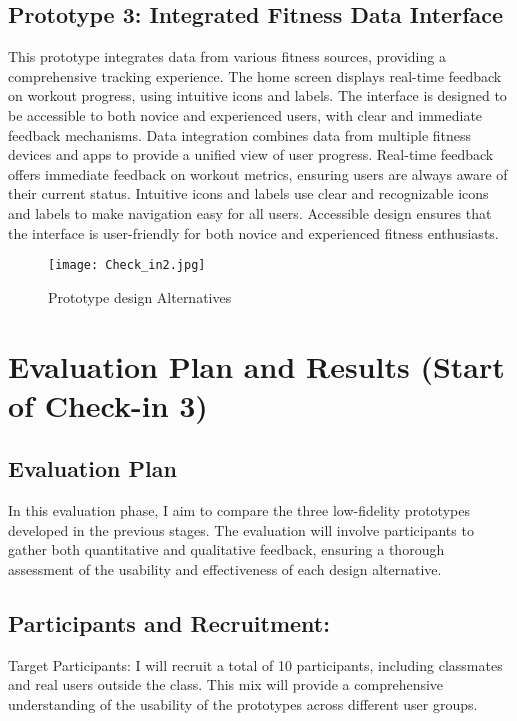 \documentclass[
	letterpaper, %
]{jdf}
\begin{document}
\subsection {Prototype 3: Integrated Fitness Data Interface}
This prototype integrates data from various fitness sources, providing a comprehensive tracking experience. The home screen displays real-time feedback on workout progress, using intuitive icons and labels. The interface is designed to be accessible to both novice and experienced users, with clear and immediate feedback mechanisms. Data integration combines data from multiple fitness devices and apps to provide a unified view of user progress. Real-time feedback offers immediate feedback on workout metrics, ensuring users are always aware of their current status. Intuitive icons and labels use clear and recognizable icons and labels to make navigation easy for all users. Accessible design ensures that the interface is user-friendly for both novice and experienced fitness enthusiasts.

\begin{figure}
    \centering
    \texttt{[image: Check\_in2.jpg]}
    \caption{Prototype design Alternatives}
    \label{fig:enter-label}
\end{figure}

\newpage

\section{Evaluation Plan and Results (Start of Check-in 3)}
\subsection{Evaluation Plan}
In this evaluation phase, I aim to compare the three low-fidelity prototypes developed in the previous stages. The evaluation will involve participants to gather both quantitative and qualitative feedback, ensuring a thorough assessment of the usability and effectiveness of each design alternative.

\subsection{Participants and Recruitment:}
Target Participants: I will recruit a total of 10 participants, including classmates and real users outside the class. This mix will provide a comprehensive understanding of the usability of the prototypes across different user groups.
\end{document}
